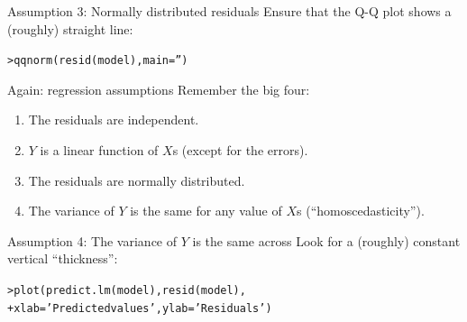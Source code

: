 \documentclass{beamer}\usepackage[]{graphicx}\usepackage[]{color}
\makeatletter
\newcommand{\hlstr}[1]{\textcolor[rgb]{1,0.894,0.71}{#1}}%
\newcommand{\hlstd}[1]{\textcolor[rgb]{1,0.894,0.769}{#1}}%
\newcommand{\hlkwc}[1]{\textcolor[rgb]{0.78,0.941,0.545}{#1}}%
\newcommand{\hlkwd}[1]{\textcolor[rgb]{1,0.78,0.769}{#1}}%
\newenvironment{kframe}{%
 \def\at@end@of@kframe{}%
 \ifinner\ifhmode%
  \def\at@end@of@kframe{\end{minipage}}%
  \begin{minipage}{\columnwidth}%
 \fi\fi%
 \def\FrameCommand##1{\hskip\@totalleftmargin \hskip-\fboxsep
 \colorbox{shadecolor}{##1}\hskip-\fboxsep
     \hskip-\linewidth \hskip-\@totalleftmargin \hskip\columnwidth}%
 \MakeFramed {\advance\hsize-\width
   \@totalleftmargin\z@ \linewidth\hsize
   \@setminipage}}%
 {\par\unskip\endMakeFramed%
 \at@end@of@kframe}
\newenvironment{knitrout}{}{} %
\makeatother
\begin{document}
\begin{darkframes}
    
    
    \begin{frame}[fragile]{Assumption 3: Normally distributed residuals}
      Ensure that the Q-Q plot shows a (roughly) straight line:
      \fontsize{9}{9}\selectfont
\begin{knitrout}
\begin{kframe}
\begin{alltt}
\hlstd{> }\hlkwd{qqnorm}\hlstd{(}\hlkwd{resid}\hlstd{(model),} \hlkwc{main}\hlstd{=}\hlstr{''}\hlstd{)}
\end{alltt}
\end{kframe}


\end{knitrout}
    \end{frame}
    
    
    \begin{frame}{Again: regression assumptions}
    \fontsize{9}{9}\selectfont
      Remember the big four:
      \begin{enumerate}
        \item The residuals are independent.
        \item $Y$ is a linear function of $X$s (except for the errors).
        \item The residuals are normally distributed.
        \item \alert{The variance of $Y$ is the same for any value of $X$s (``homoscedasticity'').}
      \end{enumerate}
    \end{frame}
    
    
    \begin{frame}[fragile]{Assumption 4: The variance of $Y$ is the same across}
      Look for a (roughly) constant vertical ``thickness'':  
\begin{knitrout}
\begin{kframe}
\begin{alltt}
\hlstd{> }\hlkwd{plot}\hlstd{(}\hlkwd{predict.lm}\hlstd{(model),} \hlkwd{resid}\hlstd{(model),}
\hlstd{+ }  \hlkwc{xlab}\hlstd{=}\hlstr{'Predicted values'}\hlstd{,} \hlkwc{ylab}\hlstd{=}\hlstr{'Residuals'}\hlstd{)}
\end{alltt}
\end{kframe}


\end{knitrout}
    \end{frame}
    

\end{darkframes}
\end{document}
